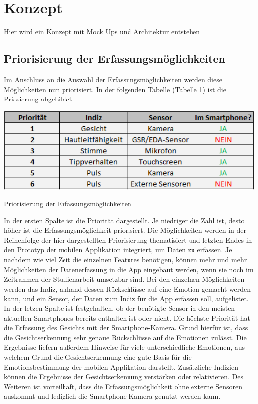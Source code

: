 \section{Konzept}
Hier wird ein Konzept mit Mock Ups und Architektur entstehen

\subsection{Priorisierung der Erfassungsmöglichkeiten}
Im Anschluss an die Auswahl der Erfassungsmöglichkeiten werden diese Möglichkeiten nun priorisiert. In der folgenden Tabelle (Tabelle 1) ist die Priosierung abgebildet. \newline
\begin{table}[h]
	\centering
	\includegraphics[width=15cm]{Bilder/prio.png}
	\caption[Priorisierung der Erfassungsmöglichkeiten]{Priorisierung der Erfassungsmöglichkeiten}
\end{table}%
\newline In der ersten Spalte ist die Priorität dargestellt. Je niedriger die Zahl ist, desto höher ist die Erfassungsmöglichkeit priorisiert. Die Möglichkeiten werden in der Reihenfolge der hier dargestellten Priorisierung thematisiert und letzten Endes in den Prototyp der mobilen Applikation integriert, um Daten zu erfassen. Je nachdem wie viel Zeit die einzelnen Features benötigen, können mehr und mehr Möglichkeiten der Datenerfassung in die App eingebaut werden, wenn sie noch im Zeitrahmen der Studienarbeit umsetzbar sind. Bei den einzelnen Möglichkeiten werden das Indiz, anhand dessen Rückschlüsse auf eine Emotion gemacht werden kann, und ein Sensor, der Daten zum Indiz für die App erfassen soll, aufgelistet. In der letzen Spalte ist festgehalten, ob der benötigte Sensor in den meisten aktuellen Smartphones bereits enthalten ist oder nicht. \newline
Die höchste Priorität hat die Erfassung des Gesichts mit der Smartphone-Kamera. Grund hierfür ist, dass die Gesichtserkennung sehr genaue Rückschlüsse auf die Emotionen zulässt. Die Ergebnisse liefern außerdem Hinweise für viele unterschiedliche Emotionen, aus welchem Grund die Gesichtserkennung eine gute Basis für die Emotionsbestimmung der mobilen Applikation darstellt. Zusätzliche Indizien können die Ergebnisse der Gesichtserkennung verstärken oder relativieren. Des Weiteren ist vorteilhaft, dass die Erfassungsmöglichkeit ohne externe Sensoren auskommt und lediglich die Smartphone-Kamera genutzt werden kann. 
